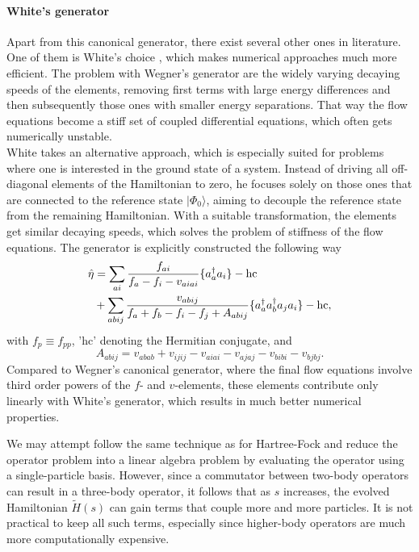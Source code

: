 \documentclass[amsmath, amssymb, aps, floatfix, nofootinbib, preprintnumbers,showpacs, superscriptaddress, twocolumn]{revtex4-1}
\newcommand{\da}{^\dagger}
\begin{document}
\paragraph*{White's generator}
Apart from this canonical generator, there exist several other ones in
literature. One of them is White's choice
\cite{White:cond-mat0201346}, which makes numerical approaches much
more efficient.  The problem with Wegner's generator are the widely
varying decaying speeds of the elements, removing first terms with
large energy differences and then subsequently those ones with smaller
energy separations.  That way the flow equations become a stiff set of
coupled differential equations, which often gets numerically
unstable.\\ White takes an alternative approach, which is especially
suited for problems where one is interested in the ground state of a
system. Instead of driving all off-diagonal elements of the
Hamiltonian to zero, he focuses solely on those ones that are
connected to the reference state $|\Phi_0\rangle$, aiming to decouple
the reference state from the remaining Hamiltonian. With a suitable
transformation, the elements get similar decaying speeds, which solves
the problem of stiffness of the flow equations.  The generator is
explicitly constructed the following way
\cite{PhysRevLett.106.222502,White:cond-mat0201346}
\begin{align}
\hat{\eta} &= \sum_{ai} \frac{f_{ai}}{f_a-f_i-v_{aiai}}\lbrace a_a\da a_i\rbrace -\text{hc} \notag \\ & + \sum_{abij}
\frac{v_{abij}}{f_a+f_b-f_i-f_j+A_{abij}}\lbrace a_a\da a_b\da a_j
a_i\rbrace - \text{hc},
\label{eq:WhiteFull}
\end{align}
with $f_p \equiv f_{pp}$, 'hc' denoting the Hermitian conjugate, and
\[
A_{abij} = v_{abab} + v_{ijij} - v_{aiai} - v_{ajaj} - v_{bibi} -
v_{bjbj}.
\label{eq:White7}
\]
Compared to Wegner's canonical generator, where the final flow
equations involve third order powers of the $f$- and $v$-elements,
these elements contribute only linearly with White's generator, which
results in much better numerical properties.




We may attempt follow the same technique as for Hartree-Fock and reduce the
operator problem into a linear algebra problem by evaluating the operator
using a single-particle basis.  However, since a commutator between two-body
operators can result in a three-body operator, it follows that as $s$
increases, the evolved Hamiltonian $\tilde H(s)$ can gain terms that couple
more and more particles.  It is not practical to keep all such terms,
especially since higher-body operators are much more computationally
expensive.
\end{document}
